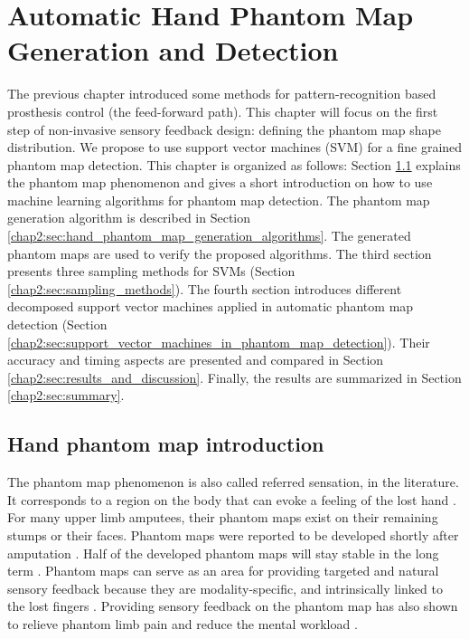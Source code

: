 \chapter{Automatic Hand Phantom Map Generation and Detection}
\label{chap_automatic_hand_phantom_map_generation_detection}
The previous chapter introduced some methods for pattern-recognition based prosthesis control (the feed-forward path). 
This chapter will focus on the first step of non-invasive sensory feedback design: defining the phantom map shape distribution. We propose to use support vector machines (SVM) for a fine grained phantom map detection. This chapter is organized as follows:  
Section \ref{chap2:sec:hand_phantom_map_introduction} explains the phantom map phenomenon and gives a short introduction on how to use machine learning algorithms for phantom map detection.
The phantom map generation algorithm is described in Section \ref{chap2:sec:hand_phantom_map_generation_algorithms}. The generated phantom maps are used to verify the proposed algorithms. 
The third section presents three sampling methods for SVMs (Section \ref{chap2:sec:sampling_methods}). 
The fourth section introduces different decomposed support vector machines applied in automatic phantom map detection (Section \ref{chap2:sec:support_vector_machines_in_phantom_map_detection}). 
Their accuracy and timing aspects are presented and compared in Section \ref{chap2:sec:results_and_discussion}. 
Finally, the results are summarized in Section \ref{chap2:sec:summary}. 

\section{Hand phantom map introduction}
\label{chap2:sec:hand_phantom_map_introduction}
The phantom map phenomenon is also called referred sensation, in the literature. It corresponds to a region on the body that can evoke a feeling of the lost hand \cite{bjorkman2012phantom, halligan1993thumb}. For many upper limb amputees, their phantom maps exist on their remaining stumps or their faces. Phantom maps were reported to be developed shortly after amputation \cite{ramachandran1998perception, woodhouse2005phantom, kooijman2000phantom, carlen1978phantom}. Half of the developed phantom maps will stay stable in the long term \cite{ramachandran1998perception}. Phantom maps can serve as an area for providing targeted and natural sensory feedback because they are modality-specific, and intrinsically linked to the lost fingers \cite{zhang2015somatotopical, antfolk2013artificial, antfolk2012sensory}. Providing sensory feedback on the phantom map has also shown to relieve phantom limb pain \cite{dietrich2012sensory} and reduce the mental workload \cite{zhang2015somatotopical}. 

